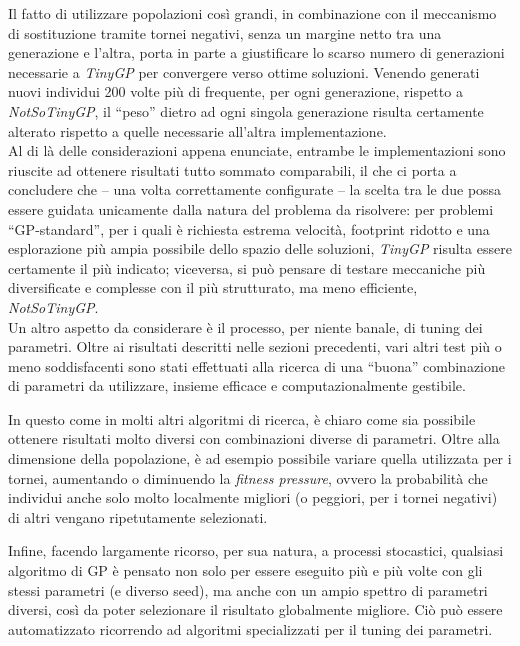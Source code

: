 \documentclass{../llncs}
\begin{document}
Il fatto di utilizzare popolazioni così grandi, in combinazione con il meccanismo di sostituzione tramite tornei negativi, senza un margine netto tra una generazione e l'altra, porta in parte a giustificare lo scarso numero di generazioni necessarie a \emph{TinyGP} per convergere verso ottime soluzioni. Venendo generati nuovi individui 200 volte più di frequente, per ogni generazione, rispetto a \emph{NotSoTinyGP}, il ``peso'' dietro ad ogni singola generazione risulta certamente alterato rispetto a quelle necessarie all'altra implementazione.\\

Al di là delle considerazioni appena enunciate, entrambe le implementazioni sono riuscite ad ottenere risultati tutto sommato comparabili, il che ci porta a concludere che -- una volta correttamente configurate -- la scelta tra le due possa essere guidata unicamente dalla natura del problema da risolvere: per problemi ``GP-standard'', per i quali è richiesta estrema velocità, footprint ridotto e una esplorazione più ampia possibile dello spazio delle soluzioni, \emph{TinyGP} risulta essere certamente il più indicato; viceversa, si può pensare di testare meccaniche più diversificate e complesse con il più strutturato, ma meno efficiente, \emph{NotSoTinyGP}.\\

Un altro aspetto da considerare è il processo, per niente banale, di tuning dei parametri. Oltre ai risultati descritti nelle sezioni precedenti, vari altri test più o meno soddisfacenti sono stati effettuati alla ricerca di una ``buona'' combinazione di parametri da utilizzare, insieme efficace e computazionalmente gestibile.

In questo come in molti altri algoritmi di ricerca, è chiaro come sia possibile ottenere risultati molto diversi con combinazioni diverse di parametri. Oltre alla dimensione della popolazione, è ad esempio possibile variare quella utilizzata per i tornei, aumentando o diminuendo la \emph{fitness pressure}, ovvero la probabilità che individui anche solo molto localmente migliori (o peggiori, per i tornei negativi) di altri vengano ripetutamente selezionati.

Infine, facendo largamente ricorso, per sua natura, a processi stocastici, qualsiasi algoritmo di GP è pensato non solo per essere eseguito più e più volte con gli stessi parametri (e diverso seed), ma anche con un ampio spettro di parametri diversi, così da poter selezionare il risultato globalmente migliore. Ciò può essere automatizzato ricorrendo ad algoritmi specializzati per il tuning dei parametri.
\end{document}
